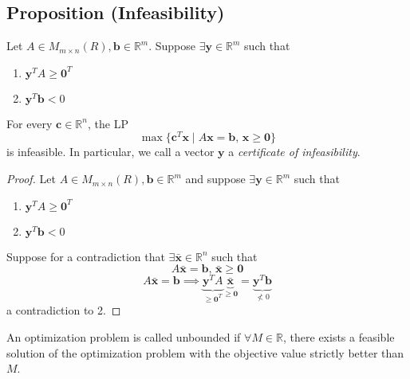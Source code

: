 \subsection{Proposition (Infeasibility)}
Let $A\in M_{m\times n}(R), \mathbf{b}\in\mathbb{R}^m$. Suppose
$\exists \mathbf{y}\in\mathbb{R}^m$ such that
\begin{enumerate}
    \item $\mathbf{y}^TA\ge\mathbf{0}^T$
    \item $\mathbf{y}^T\mathbf{b}<0$
\end{enumerate}
For every $\mathbf{c}\in\mathbb{R}^n$, the LP
\[\max \{\mathbf{c}^T\mathbf{x} \mid A\mathbf{x}=\mathbf{b}\text{, }
\mathbf{x}\ge\mathbf{0}\}\]
is infeasible. In particular, we call a vector $\mathbf{y}$ a \emph{certificate of infeasibility}.

\begin{proof}
    Let $A\in M_{m\times n}(R), \mathbf{b}\in\mathbb{R}^m$ and suppose
$\exists \mathbf{y}\in\mathbb{R}^m$ such that
\begin{enumerate}
    \item $\mathbf{y}^TA\ge\mathbf{0}^T$
    \item $\mathbf{y}^T\mathbf{b}<0$
\end{enumerate}
Suppose for a contradiction that $\exists\mathbf{\bar{x}}\in\mathbb{R}^n$ 
such that
\[A\mathbf{\bar{x}}=\mathbf{b} \text{, }\mathbf{\bar{x}}\ge \mathbf{0}\]
\[
    A\mathbf{\bar{x}}=\mathbf{b}
    \implies
    \underbrace{\mathbf{y}^TA}_{\ge\mathbf{0}^T}
    \underbrace{\mathbf{\bar{x}}}_{\ge\mathbf{0}}
    =\underbrace{\mathbf{y}^T\mathbf{b}}_{\nless 0}
\]
a contradiction to 2.
\end{proof}

An optimization problem is called unbounded if $\forall M\in\mathbb{R}$, there
exists a feasible solution of the optimization problem with the objective 
value strictly better than $M$.
